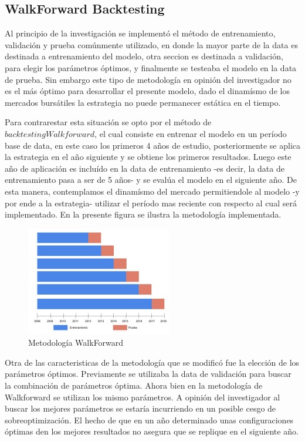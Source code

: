\documentclass[a4paper,12pt]{Latex/Classes/PhDthesisPSnPDF}
\begin{document}
\subsection{WalkForward Backtesting}

Al principio de la investigación se implementó el método de entrenamiento, validación y prueba comúnmente utilizado, en donde la mayor parte de la data es destinada a entrenamiento del modelo, otra seccion es destinada a validación, para elegir los parámetros óptimos, y finalmente se testeaba el modelo en la data de prueba. Sin embargo este tipo de metodología en opinión del investigador no es el más óptimo para desarrollar el presente modelo, dado el dinamísmo de los mercados bursátiles la estrategia no puede permanecer estática en el tiempo.

Para contrarestar esta situación se opto por el método de $backtesting Walkforward$, el cual consiste en entrenar el modelo en un período base de data, en este caso los primeros 4 años de estudio, posteriormente se aplica la estrategia en el año siguiente y se obtiene los primeros resultados. Luego este año de aplicación es incluído en la data de entrenamiento -es decir, la data de entrenamiento pasa a ser de 5 años- y se evalúa el modelo en el siguiente año. De esta manera, contemplamos el dinamísmo del mercado permitiendole al modelo -y por ende a la estrategia- utilizar el período mas reciente con respecto al cual será implementado. En la presente figura se ilustra la metodología implementada.

\begin{figure}[ht]
\begin{center}
\includegraphics[width=2.5in]{images/walkforward_plot}
\end{center}
\caption{Metodología WalkForward}
\end{figure}

Otra de las caracteristicas de la metodología que se modificó fue la elección de los parámetros óptimos. Previamente se utilizaba la data de validación para buscar la combinación de parámetros óptima. Ahora bien en la metodología de Walkforward se utilizan los mismo parámetros. A opinión del investigador al buscar los mejores parámetros se estaría incurriendo en un posible cesgo de sobreoptimización. El hecho de que en un año determinado unas configuraciones óptimas den los mejores resultados no asegura que se replique en el siguiente año.
\end{document}
